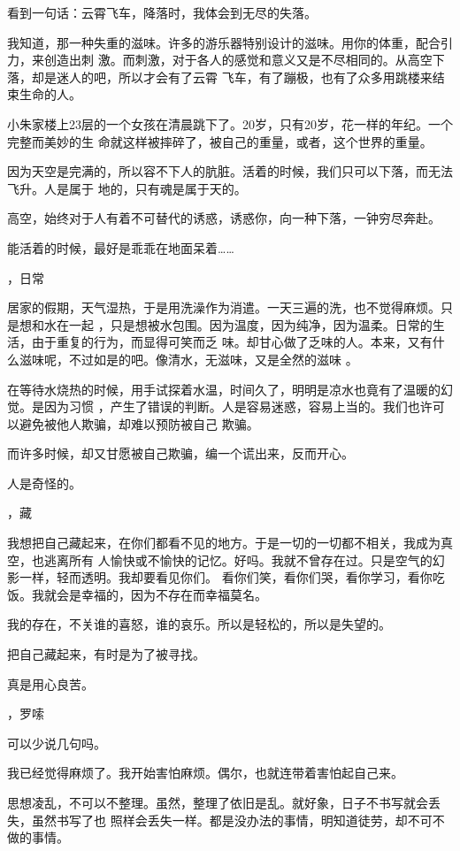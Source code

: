 \documentclass[12pt,a4paper]{article}
\newcommand{\subpart}[1]{
	\begingroup \par
	\vspace{1ex} \centering #1
	\par \endgroup \nopagebreak[4]
}
\begin{document}
		看到一句话：云霄飞车，降落时，我体会到无尽的失落。

		我知道，那一种失重的滋味。许多的游乐器特别设计的滋味。用你的体重，配合引力，来创造出刺
	激。而刺激，对于各人的感觉和意义又是不尽相同的。从高空下落，却是迷人的吧，所以才会有了云霄
	飞车，有了蹦极，也有了众多用跳楼来结束生命的人。

		小朱家楼上23层的一个女孩在清晨跳下了。20岁，只有20岁，花一样的年纪。一个完整而美妙的生
	命就这样被摔碎了，被自己的重量，或者，这个世界的重量。

		因为天空是完满的，所以容不下人的肮脏。活着的时候，我们只可以下落，而无法飞升。人是属于
	地的，只有魂是属于天的。

		高空，始终对于人有着不可替代的诱惑，诱惑你，向一种下落，一钟穷尽奔赴。

		能活着的时候，最好是乖乖在地面呆着……


		\subpart{6，日常}

		居家的假期，天气湿热，于是用洗澡作为消遣。一天三遍的洗，也不觉得麻烦。只是想和水在一起
	，只是想被水包围。因为温度，因为纯净，因为温柔。日常的生活，由于重复的行为，而显得可笑而乏
	味。却甘心做了乏味的人。本来，又有什么滋味呢，不过如是的吧。像清水，无滋味，又是全然的滋味
	。

		在等待水烧热的时候，用手试探着水温，时间久了，明明是凉水也竟有了温暖的幻觉。是因为习惯
	，产生了错误的判断。人是容易迷惑，容易上当的。我们也许可以避免被他人欺骗，却难以预防被自己
	欺骗。

		而许多时候，却又甘愿被自己欺骗，编一个谎出来，反而开心。

		人是奇怪的。


		\subpart{7，藏}

		我想把自己藏起来，在你们都看不见的地方。于是一切的一切都不相关，我成为真空，也逃离所有
	人愉快或不愉快的记忆。好吗。我就不曾存在过。只是空气的幻影一样，轻而透明。我却要看见你们。
	看你们笑，看你们哭，看你学习，看你吃饭。我就会是幸福的，因为不存在而幸福莫名。

		我的存在，不关谁的喜怒，谁的哀乐。所以是轻松的，所以是失望的。

		把自己藏起来，有时是为了被寻找。

		真是用心良苦。


		\subpart{8，罗嗦}

		可以少说几句吗。

		我已经觉得麻烦了。我开始害怕麻烦。偶尔，也就连带着害怕起自己来。

		思想凌乱，不可以不整理。虽然，整理了依旧是乱。就好象，日子不书写就会丢失，虽然书写了也
	照样会丢失一样。都是没办法的事情，明知道徒劳，却不可不做的事情。
\end{document}
